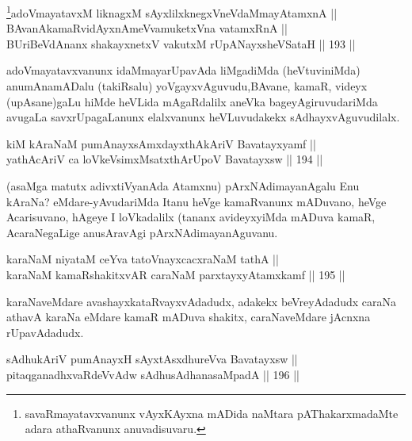 \begin{shl}
\footnote{savaRmayatavxvanunx vAyxKAyxna mADida naMtara pAThakarxmadaMte adara athaRvanunx anuvadisuvaru.}adoVmayatavxM liknagxM sAyxlilxknegxVneVdaMmayAtamxnA || \\
BAvanAkamaRvidAyxnAmeVvamuketxVna vatamxRnA || \\
BUriBeVdAnanx shakayxnetxV vakutxM rUpANayxsheVSataH \hfill || 193 ||  
\end{shl}

\begin{artha}
adoVmayatavxvanunx idaMmayarUpavAda liMgadiMda
(heVtuviniMda) anumAnamADalu (takiRsalu) yoVgayxvAguvudu,\break BAvane,
kamaR, videyx (upAsane)gaLu hiMde heVLida mAgaRdalilx aneVka
bageyAgiruvudariMda avugaLa savxrUpagaLanunx elalxvanunx heVLuvudakekx
sAdhayxvAguvudilalx.
\end{artha}

\begin{shl}
kiM kAraNaM pumAnayxsAmxdayxthAkAriV Bavatayxyamf || \\
yathAcAriV ca loVkeV\s simxMsatxthArUpoV Bavatayxsw \hfill || 194 ||  
\end{shl}

\begin{artha}
(asaMga matutx adivxtiVyanAda Atamxnu) pArxNAdimayanAgalu Enu
kAraNa? eMdare-yAvudariMda Itanu heVge kamaRvanunx mADuvano, heVge
Acarisuvano, hAgeye I loVkadalilx (tananx avideyxyiMda mADuva kamaR,
AcaraNegaLige anusAravAgi pArxNAdimayanAguvanu.
\end{artha}


\begin{shl}
karaNaM niyataM ceYva tatoV\s nayxcacxraNaM tathA || \\
karaNaM kamaRshakitxvAR caraNaM parxtayxyAtamxkamf \hfill || 195 ||  
\end{shl}

\begin{artha}
karaNaveMdare avashayxkataRvayxvAdadudx, adakekx beVreyAdadudx caraNa
athavA karaNa eMdare kamaR mADuva shakitx, caraNaveMdare jAcnxna
rUpavAdadudx.
\end{artha}


\begin{shl}
sAdhukAriV pumAnayxH sAyxtAsxdhureVva Bavatayxsw || \\
pitaqganadhxvaRdeVvAdw sAdhusAdhanasaMpadA \hfill || 196 ||  
\end{shl}

